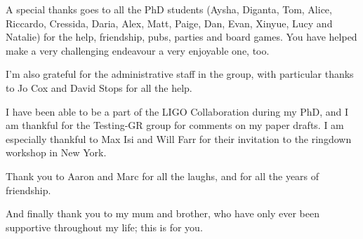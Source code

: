 \documentclass[
12pt, %
english, %
doublespacing, %
headsepline, %
]{MastersDoctoralThesis} %
\begin{document}
\begin{singlespacing}
\begin{acknowledgements}
A special thanks goes to all the PhD students (Aysha, Diganta, Tom, Alice, Riccardo, Cressida, Daria, Alex, Matt, Paige, Dan, Evan, Xinyue, Lucy and Natalie) for the help, friendship, pubs, parties and board games. 
You have helped make a very challenging endeavour a very enjoyable one, too.

I’m also grateful for the administrative staff in the group, with particular thanks to Jo Cox and David Stops for all the help. 

I have been able to be a part of the LIGO Collaboration during my PhD, and I am thankful for the Testing-GR group for comments on my paper drafts. 
I am especially thankful to Max Isi and Will Farr for their invitation to the ringdown workshop in New York.

Thank you to Aaron and Marc for all the laughs, and for all the years of friendship. %

And finally thank you to my mum and brother, who have only ever been supportive throughout my life; this is for you.

\end{acknowledgements}

\end{singlespacing}






\tableofcontents %

\listoffigures %



\end{document}
